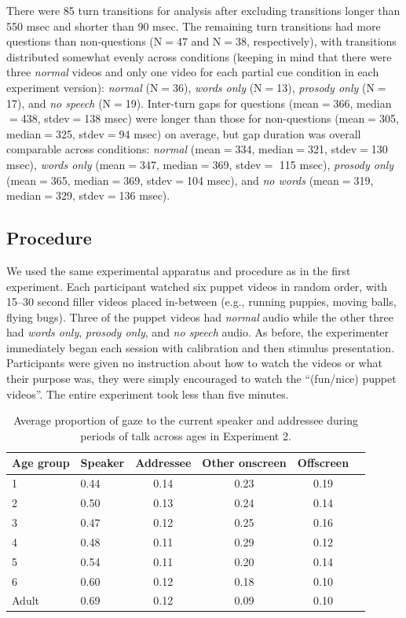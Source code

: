 \documentclass[authoryear, 12pt]{elsarticle}
\begin{document}
There were 85 turn transitions for analysis after excluding transitions longer than 550 msec and shorter than 90 msec. The remaining turn transitions had more questions than non-questions (N$=$47 and N$=$38, respectively), with transitions distributed somewhat evenly across conditions (keeping in mind that there were three \textit{normal} videos and only one video for each partial cue condition in each experiment version): \textit{normal} (N$=$36), \textit{words only} (N$=$13), \textit{prosody only} (N$=$17), and \textit{no speech} (N$=$19). Inter-turn gaps for questions (mean$=$366, median$=$438, stdev$=$138 msec) were longer than those for non-questions (mean$=$305, median$=$325, stdev$=$94 msec) on average, but gap duration was overall comparable across conditions: \textit{normal} (mean$=$334, median$=$321, stdev$=$130 msec), \textit{words only} (mean$=$347, median$=$369, stdev$=$ 115 msec), \textit{prosody only} (mean$=$365, median$=$369, stdev$=$104 msec), and \textit{no words} (mean$=$319, median$=$329, stdev$=$136 msec).

\subsection*{Procedure}
We used the same experimental apparatus and procedure as in the first experiment. Each participant watched six puppet videos in random order, with 15--30 second filler videos placed in-between (e.g., running puppies, moving balls, flying bugs). Three of the puppet videos had \textit{normal} audio while the other three had \textit{words only}, \textit{prosody only}, and \textit{no speech} audio. As before, the experimenter immediately began each session with calibration and then stimulus presentation. Participants were given no instruction about how to watch the videos or what their purpose was, they were simply encouraged to watch the ``(fun/nice) puppet videos''. The entire experiment took less than five minutes.

\linespread{1}
\begin{table}[t]
\begin{center}
  \begin{tabular}{llcccc}
    \hline
    Age group & Speaker & Addressee & Other onscreen & Offscreen\\ 
    \hline
    1 & 0.44 & 0.14 & 0.23 & 0.19 \\ 
    2 & 0.50 & 0.13 & 0.24 & 0.14 \\ 
    3 & 0.47 & 0.12 & 0.25 & 0.16 \\ 
    4 & 0.48 & 0.11 & 0.29 & 0.12 \\ 
    5 & 0.54 & 0.11 & 0.20 & 0.14 \\ 
    6 & 0.60 & 0.12 & 0.18 & 0.10 \\
    Adult & 0.69 & 0.12 & 0.09 & 0.10 \\
    \hline
  \end{tabular}
\end{center}
  \caption{Average proportion of gaze to the current speaker and addressee during periods of talk across ages in Experiment 2.}
\label{tab:look_e2}
\end{table}
\end{document}
